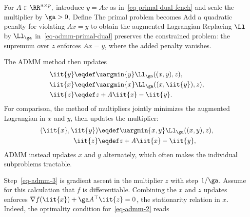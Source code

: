 For $A \in \RR^{n \times p}$, introduce $y=Ax$ as in~\eqref{eq-primal-dual-fench} and scale the multiplier by $\ga>0$. Define
The primal problem becomes
Add a quadratic penalty for violating $Ax=y$ to obtain the augmented Lagrangian
Replacing $\Ll$ by $\Ll_\ga$ in~\eqref{eq-admm-primal-dual} preserves the constrained problem: the supremum over $z$ enforces $Ax=y$, where the added penalty vanishes.

The ADMM method then updates
\begin{align}
	\label{eq-admm-1}\iit{y} &\eqdef \uargmin{y} \Ll_\ga( (\it{x},y),\it{z}  ), \\
	\label{eq-admm-2}\iit{x} &\eqdef \uargmin{x} \Ll_\ga( (x,\iit{y}),\it{z}  ), \\
	\label{eq-admm-3}\iit{z} &\eqdef \it{z} + A \iit{x}-\iit{y}. 
\end{align}
For comparison, the method of multipliers jointly minimizes the augmented Lagrangian in $x$ and $y$, then updates the multiplier:
\begin{align*}
	(\iit{x},\iit{y}) &\eqdef \uargmin{x,y} \Ll_\ga( (x,y),\it{z}  ), \\
	\iit{z} &\eqdef \it{z} + A \iit{x}-\iit{y}, 
\end{align*}
ADMM instead updates $x$ and $y$ alternately, which often makes the individual subproblems tractable.

Step~\eqref{eq-admm-3} is gradient ascent in the multiplier $z$ with step $1/\ga$. Assume for this calculation that $f$ is differentiable. Combining the $x$ and $z$ updates enforces $\nabla f(\iit{x})+\ga A^\top\iit{z}=0$, the stationarity relation in $x$. Indeed, the optimality condition for~\eqref{eq-admm-2} reads

